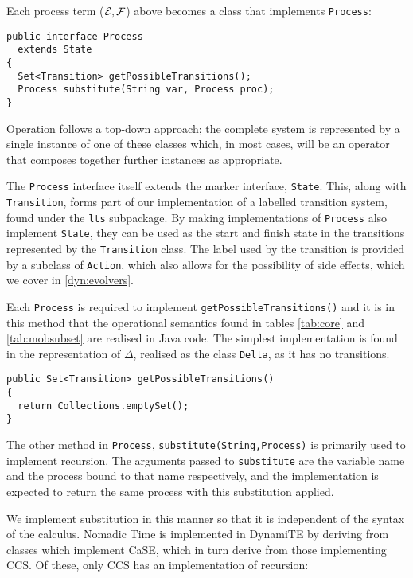 Each process term ($\text{$\mathcal{E}$}, \text{$\mathcal{F}$}$) above becomes a class that implements \texttt{Process}:

\begin{verbatim}
public interface Process
  extends State
{
  Set<Transition> getPossibleTransitions();
  Process substitute(String var, Process proc);
}
\end{verbatim}

Operation follows a top-down approach; the complete system is
represented by a single instance of one of these classes which, in
most cases, will be an operator that composes together further
instances as appropriate.

The \texttt{Process} interface itself extends the marker interface,
\texttt{State}.  This, along with \texttt{Transition}, forms part of
our implementation of a labelled transition system, found under the
\texttt{lts} subpackage.  By making implementations of
\texttt{Process} also implement \texttt{State}, they can be used as
the start and finish state in the transitions represented by the
\texttt{Transition} class.  The label used by the transition is
provided by a subclass of \texttt{Action}, which also allows for the
possibility of side effects, which we cover in \ref{dyn:evolvers}.

Each \texttt{Process} is required to implement
\texttt{getPossibleTransitions()} and it is in this method that the
operational semantics found in tables \ref{tab:core} and
\ref{tab:mobsubset} are realised in Java code.  The simplest
implementation is found in the representation of $\Delta$, realised as
the class \texttt{Delta}, as it has no transitions.

\begin{verbatim}
public Set<Transition> getPossibleTransitions()
{
  return Collections.emptySet();
}
\end{verbatim}

The other method in \texttt{Process},
\texttt{substitute(String,Process)} is primarily used to implement
recursion.  The arguments passed to \texttt{substitute} are the
variable name and the process bound to that name respectively, and the
implementation is expected to return the same process with this
substitution applied.

We implement substitution in this manner so that it is independent of
the syntax of the calculus.  Nomadic Time is implemented in DynamiTE
by deriving from classes which implement CaSE, which in turn derive
from those implementing CCS.  Of these, only CCS has an implementation
of recursion:

